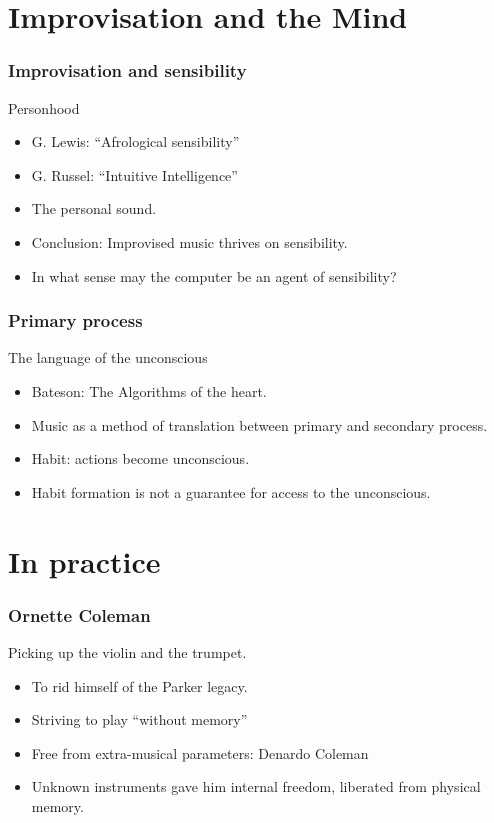 \documentclass{beamer}
\begin{document}
\section{Improvisation and the Mind}


\begin{frame}
  \frametitle{Improvisation and sensibility}
  \begin{block}{Personhood}
    \begin{itemize}
    \item<1-> G. Lewis: ``Afrological sensibility''
    \item<2-> G. Russel: ``Intuitive Intelligence''
    \item<3-> The personal sound.
    \item<4-> Conclusion: Improvised music thrives on sensibility.
    \item<5-> In what sense may the computer be an agent of sensibility?
    \end{itemize}
  \end{block}
\end{frame}

\begin{frame}
  \frametitle{Primary process}
  \begin{block}{The language of the unconscious}
    \begin{itemize}
    \item<1-> Bateson: The Algorithms of the heart.
    \item<2-> Music as a method of translation between primary and secondary process.
    \item<3-> Habit: actions become unconscious.
    \item<4-> Habit formation is not a guarantee for access to the unconscious.
    \end{itemize}
  \end{block}
\end{frame}

\section{In practice}


\begin{frame}
  \frametitle{Ornette Coleman}
  \begin{block}{Picking up the violin and the trumpet.}
    \begin{itemize}
    \item<1-> To rid himself of the Parker legacy.
    \item<2-> Striving to play ``without memory''
    \item<3-> Free from extra-musical parameters: Denardo Coleman
    \item<4-> Unknown instruments gave him internal freedom, liberated from physical memory.
    \end{itemize}
  \end{block}
\end{frame}
\end{document}
